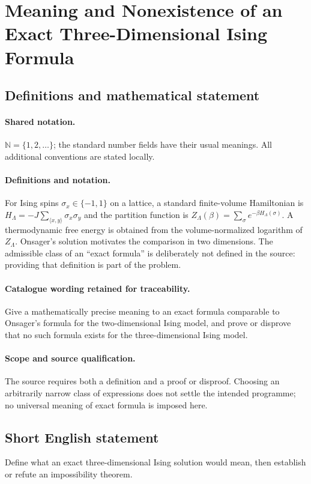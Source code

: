 \documentclass[11pt]{article}
\begin{document}
\section{Meaning and Nonexistence of an Exact Three-Dimensional Ising Formula}\label{statement}

\subsection{Definitions and mathematical statement}

\paragraph{Shared notation.}$\mathbb N=\{1,2,\ldots\}$; the standard number fields have their usual meanings. All additional conventions are stated locally.


\paragraph{Definitions and notation.}For Ising spins $\sigma_x\in\{-1,1\}$ on a lattice, a standard finite-volume Hamiltonian is $H_\Lambda=-J\sum_{\langle x,y\rangle}\sigma_x\sigma_y$ and the partition function is $Z_\Lambda(\beta)=\sum_\sigma e^{-\beta H_\Lambda(\sigma)}$. A thermodynamic free energy is obtained from the volume-normalized logarithm of $Z_\Lambda$. Onsager’s solution motivates the comparison in two dimensions. The admissible class of an ``exact formula'' is deliberately not defined in the source: providing that definition is part of the problem.

\paragraph{Catalogue wording retained for traceability.}
Give a mathematically precise meaning to an exact formula comparable to Onsager's formula for the two-dimensional Ising model, and prove or disprove that no such formula exists for the three-dimensional Ising model.
\paragraph{Scope and source qualification.}The source requires both a definition and a proof or disproof. Choosing an arbitrarily narrow class of expressions does not settle the intended programme; no universal meaning of exact formula is imposed here.
\subsection{Short English statement}
Define what an exact three-dimensional Ising solution would mean, then establish or refute an impossibility theorem.
\end{document}

